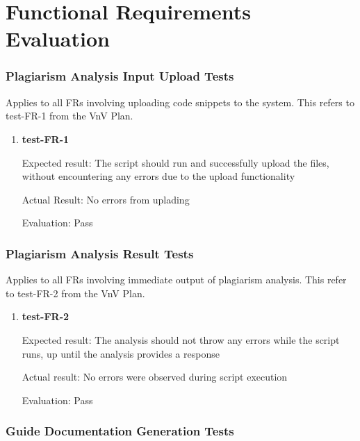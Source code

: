 \documentclass[12pt, titlepage]{article}
\begin{document}
\newpage


\section{Functional Requirements Evaluation}
\subsubsection{Plagiarism Analysis Input Upload Tests}

Applies to all FRs involving uploading code snippets to the system. This refers
to test-FR-1 from the VnV Plan.

\begin{enumerate}

\item{\textbf{test-FR-1}}

Expected result: The script should run and successfully upload the files, without 
encountering any errors due to the upload functionality

Actual Result: No errors from uplading

Evaluation: Pass
					

\end{enumerate}

\subsubsection{Plagiarism Analysis Result Tests}

Applies to all FRs involving immediate output of plagiarism analysis. This
refer to test-FR-2 from the VnV Plan.

\begin{enumerate}

\item{\textbf{test-FR-2}}

Expected result: The analysis should not throw any errors while the script runs,
up until the analysis provides a response

Actual result: No errors were observed during script execution

Evaluation: Pass

					

\end{enumerate}

\subsubsection{Guide Documentation Generation Tests}
\end{document}
